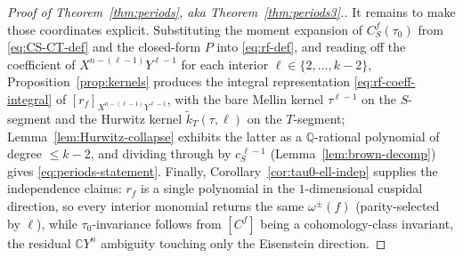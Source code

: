 \documentclass[11pt]{article}
\numberwithin{equation}{section}  %
\newcommand{\QQ}{\mathbb{Q}}
\newcommand{\CC}{\mathbb{C}}
\begin{document}
\begin{proof}[Proof of Theorem~\ref{thm:periods}, aka Theorem~\ref{thm:periods3}.]
It remains to make those coordinates explicit.  Substituting the moment
expansion of $C^f_S(\tau_0)$ from \eqref{eq:CS-CT-def} and the closed-form
$P$ into \eqref{eq:rf-def}, and reading off the coefficient of
$X^{n - (\ell - 1)} Y^{\ell - 1}$ for each interior
$\ell \in \{2, \ldots, k - 2\}$, Proposition~\ref{prop:kernels} produces
the integral representation \eqref{eq:rf-coeff-integral} of
$[r_f]_{X^{n - (\ell - 1)} Y^{\ell - 1}}$, with the bare Mellin kernel
$\tau^{\ell - 1}$ on the $S$-segment and the Hurwitz kernel
$\widetilde{k}_T(\tau, \ell)$ on the $T$-segment; Lemma~\ref{lem:Hurwitz-collapse}
exhibits the latter as a $\QQ$-rational polynomial of degree $\le k - 2$,
and dividing through by $c_S^{\,\ell - 1}$ (Lemma~\ref{lem:brown-decomp})
gives \eqref{eq:periods-statement}.  Finally,
Corollary~\ref{cor:tau0-ell-indep} supplies the independence claims:
$r_f$ is a single polynomial in the $1$-dimensional cuspidal direction, so
every interior monomial returns the same $\omega^\pm(f)$ (parity-selected
by $\ell$), while $\tau_0$-invariance follows from $[C^f]$ being a
cohomology-class invariant, the residual $\CC Y^n$ ambiguity touching only
the Eisenstein direction.

\end{proof}
\end{document}

